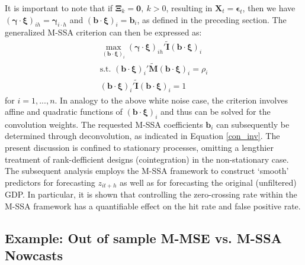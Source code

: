 \documentclass[11pt,a4paper]{article}
\begin{document}
It is important to note that if $\boldsymbol{\Xi}_k=\mathbf{0},~k>0$, resulting in $\mathbf{X}_t=\boldsymbol{\epsilon}_t$, then we have $(\boldsymbol{\gamma}\cdot\boldsymbol{\xi})_{ih}=\boldsymbol{\gamma}_{i\cdot h}$ and $(\mathbf{b}\cdot\boldsymbol{\xi})_{i}=\mathbf{b}_i$, as defined in the preceding section. The generalized M-SSA criterion can then be expressed as: 
\begin{eqnarray}\label{gen_stat_x}
\max_{(\mathbf{b}\cdot\boldsymbol{\xi})_i} (\boldsymbol{\gamma}\cdot\boldsymbol{\xi})_{ih}'\mathbf{\tilde{I}} (\mathbf{b}\cdot\boldsymbol{\xi})_i\\
\textrm{s.t.~}(\mathbf{b}\cdot\boldsymbol{\xi})_i'\mathbf{\tilde{M}}(\mathbf{b}\cdot\boldsymbol{\xi})_i=\rho_i\nonumber\\
(\mathbf{b}\cdot\boldsymbol{\xi})_i'\mathbf{\tilde{I}}(\mathbf{b}\cdot\boldsymbol{\xi})_i=1\nonumber
\end{eqnarray}
for $i=1,...,n$. In analogy to the above white noise case, the criterion involves affine and quadratic functions of $(\mathbf{b}\cdot\boldsymbol{\xi})_i$ and thus can be solved for the convolution weights. The requested M-SSA coefficients $\mathbf{b}_i$ can subsequently be determined through deconvolution, as indicated in Equation \eqref{con_inv}. 
The present discussion is confined to stationary processes, omitting a lengthier treatment of rank-defficient designs (cointegration) in the non-stationary case.\\


The subsequent analysis employs the M-SSA framework to construct `smooth' predictors for forecasting $z_{it+h}$ as well as for forecasting the original (unfiltered) GDP. In particular, it is shown that controlling the zero-crossing rate within the M-SSA framework has a quantifiable effect on the hit rate and false positive rate.

 
 

\subsection{Example: Out of sample M-MSE vs. M-SSA Nowcasts}
\end{document}
